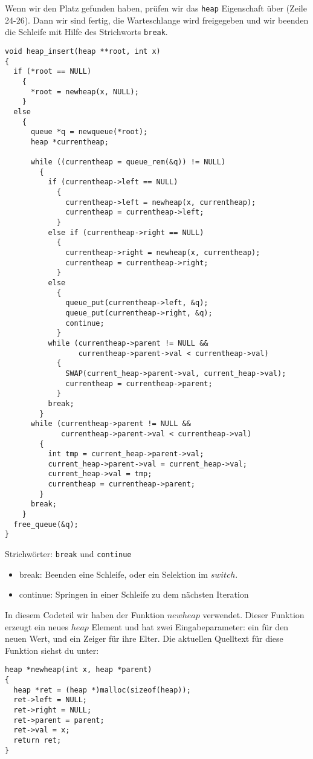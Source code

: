 Wenn wir den Platz gefunden haben, prüfen wir das \texttt{heap} Eigenschaft über
(Zeile 24-26). Dann wir sind fertig, die Warteschlange wird freigegeben und
wir beenden die Schleife mit Hilfe des Strichworts \texttt{break}.
\begin{lstlisting}
void heap_insert(heap **root, int x)
{
  if (*root == NULL)
    {
      *root = newheap(x, NULL);
    }
  else
    {
      queue *q = newqueue(*root);
      heap *currentheap;

      while ((currentheap = queue_rem(&q)) != NULL)
        {
          if (currentheap->left == NULL)
            {
              currentheap->left = newheap(x, currentheap);
              currentheap = currentheap->left;
            }
          else if (currentheap->right == NULL)
            {
              currentheap->right = newheap(x, currentheap);
              currentheap = currentheap->right;
            }
          else
            {
              queue_put(currentheap->left, &q);
              queue_put(currentheap->right, &q);
              continue;
            }
          while (currentheap->parent != NULL &&
                 currentheap->parent->val < currentheap->val)
            {
              SWAP(current_heap->parent->val, current_heap->val);
              currentheap = currentheap->parent;
            }
          break;
        }
      while (currentheap->parent != NULL &&
             currentheap->parent->val < currentheap->val)
        {
          int tmp = current_heap->parent->val;
          current_heap->parent->val = current_heap->val;
          current_heap->val = tmp;
          currentheap = currentheap->parent;
        }
      break;
    }
  free_queue(&q);
}
\end{lstlisting}
\begin{myexampleblock}{Strichwörter: \texttt{break} und \texttt{continue}}
\begin{itemize}
\item break: Beenden eine Schleife, oder ein Selektion im $switch$.
\item continue: Springen in einer Schleife zu dem nächsten Iteration
\end{itemize}
\end{myexampleblock}
In diesem Codeteil wir haben der Funktion $newheap$ verwendet. Dieser Funktion
erzeugt ein neues $heap$ Element und hat zwei Eingabeparameter: ein für den neuen 
Wert, und ein Zeiger für ihre Elter. Die aktuellen Quelltext für diese Funktion 
siehst du unter:
\begin{lstlisting}
heap *newheap(int x, heap *parent)
{
  heap *ret = (heap *)malloc(sizeof(heap));
  ret->left = NULL;
  ret->right = NULL;
  ret->parent = parent;
  ret->val = x;
  return ret;
}
\end{lstlisting}
